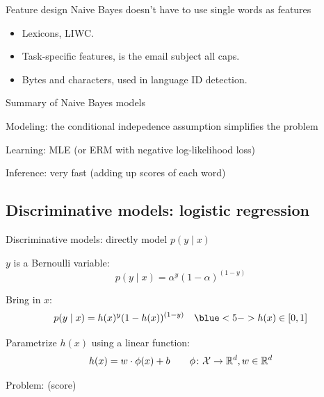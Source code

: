 \documentclass[usenames,dvipsnames,notes,11pt,aspectratio=169]{beamer}
\newcommand{\pdfnote}[1]{}
\begin{document}
\begin{frame}
    {Feature design}
        Naive Bayes doesn't have to use single words as features
    \begin{itemize}
        \itemsep1em
        \item Lexicons, \eg LIWC.
        \item Task-specific features, \eg is the email subject all caps.
        \item Bytes and characters, \eg used in language ID detection.
    \end{itemize}
    \pdfnote{
        Char/byte NB model is a very fast and effective language ID detector (e.g., google translate).
    }
\end{frame}

\begin{frame}
    {Summary of Naive Bayes models}
    \begin{wideitemize}
        \item Modeling: the conditional indepedence assumption simplifies the problem
        \item Learning: MLE (or ERM with negative log-likelihood loss)
        \item Inference: very fast (adding up scores of each word)
    \end{wideitemize}
\end{frame}

\subsection{Discriminative models: logistic regression}

\begin{frame}
    {Discriminative models: directly model $p(y\mid x)$}
    \begin{wideitemize}[<+->]
        \item $y$ is a Bernoulli variable:
            $$
            p(y\mid x) = \alpha^y (1-\alpha)^{(1-y)}
            $$
        \item Bring in $x$:
            $$
            p(y\mid x) = h(x)^y (1-h(x))^{(1-y)} \quad \blue<5->{h(x) \in [0,1]}
            $$
        \item Parametrize $h(x)$ using a linear function:
    $$
    h(x) = w\cdot \phi(x) + b \quad\quad \phi\colon \mathcal{X} \rightarrow \mathbb{R}^d, w\in\mathbb{R}^d
    $$
\item Problem:  (score)
    \end{wideitemize}

\end{frame}
\end{document}
